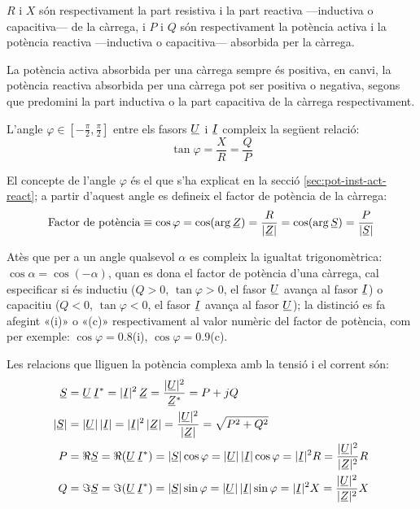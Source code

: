 $R$ i $X$ són respectivament la part resistiva i la part reactiva ---inductiva o capacitiva--- de la càrrega, i $P$ i $Q$ són
respectivament la potència activa i la potència reactiva ---inductiva
o capacitiva--- absorbida per la càrrega.

La potència activa absorbida per una càrrega sempre és positiva, en
canvi, la potència reactiva absorbida per una càrrega pot ser
positiva o negativa, segons que predomini la part inductiva o la
part capacitiva de la càrrega respectivament.

L'angle $\varphi\in[-\frac{\pi}{2},\frac{\pi}{2}]$ entre els fasors $\cmplx{U}$ i $\cmplx{I}$ compleix la següent relació:
\begin{equation}
   \tan\varphi = \frac{X}{R} = \frac{Q}{P}
\end{equation}

El concepte de l'angle $\varphi$ és el  que s'ha explicat en la secció \ref{sec:pot-inst-act-react}; a partir d'aquest angle es
defineix el factor de potència de la càrrega:
\begin{equation}
   \text{Factor de potència} \equiv \cos\varphi = \cos (\arg \cmplx{Z}) =
   \frac{R}{|\cmplx{Z}|} =
   \cos (\arg \cmplx{S}) =
   \frac{P}{|\cmplx{S}|}
\end{equation}

Atès que per a un angle qualsevol $\alpha$ es compleix la igualtat
trigonomètrica: $\cos\alpha = \cos(-\alpha)$, quan es dona el factor
de potència d'una càrrega, cal especificar si és inductiu ($Q>0$,
$\tan\varphi>0$, el fasor $\cmplx{U}$ avança al fasor $\cmplx{I}$) o
capacitiu ($Q<0$, $\tan\varphi<0$, el fasor $\cmplx{I}$ avança al fasor $\cmplx{U}$); la distinció es fa
afegint «(i)» o «(c)» respectivament al valor numèric del factor
de potència, com per exemple: $\cos\varphi=\num{0,8}$(i),
$\cos\varphi=\num{0,9}$(c).

Les relacions que lliguen la potència complexa amb la tensió i el corrent són:
\begin{align}
   \cmplx{S} &=  \cmplx{U} \,\cmplx{I}^* =
   |\cmplx{I}|^2 \,\cmplx{Z} = \frac{|\cmplx{U}|^2}{\cmplx{Z}^*} =
   P + j Q \label{eq:s_mono1}\\
   |\cmplx{S}| &= |\cmplx{U}| \,|\cmplx{I}| =
   |\cmplx{I}|^2 \,|\cmplx{Z}| = \frac{|\cmplx{U}|^2}{|\cmplx{Z}|} =
   \sqrt{P^2+Q^2} \\
   P &= \Re\cmplx{S} = \Re (\cmplx{U} \, \cmplx{I}^*) = |\cmplx{S}| \cos\varphi =
   |\cmplx{U}|\, |\cmplx{I}| \cos\varphi = |\cmplx{I}|^2 R =
   \frac{|\cmplx{U}|^2}{|\cmplx{Z}|^2}R\\
   Q &= \Im\cmplx{S} = \Im (\cmplx{U} \, \cmplx{I}^*) = |\cmplx{S}| \sin\varphi =
   |\cmplx{U}| \,|\cmplx{I}|\sin\varphi  = |\cmplx{I}|^2 X =
   \frac{|\cmplx{U}|^2}{|\cmplx{Z}|^2}X
\end{align}

